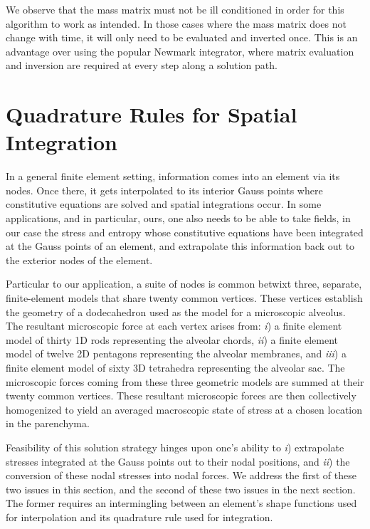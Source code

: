We observe that the mass matrix must not be ill conditioned in order for this algorithm to work as intended.  In those cases where the mass matrix does not change with time, it will only need to be evaluated and inverted once.  This is an advantage over using the popular Newmark \cite{Newmark59} integrator, where matrix evaluation and inversion are required at every step along a solution path.


\section{Quadrature Rules for Spatial Integration}
\label{sec:Gauss}

In a general finite element setting, information comes into an element via its nodes.  Once there, it gets interpolated to its interior Gauss points where constitutive equations are solved and spatial integrations occur.  In some applications, and in particular, ours, one also needs to be able to take fields, in our case the stress and entropy whose constitutive equations have been integrated at the Gauss points of an element, and extrapolate this information back out to the exterior nodes of the element.

Particular to our application, a suite of nodes is common betwixt three, separate, finite-element models that share twenty common vertices.  These vertices establish the geometry of a dodecahedron used as the model for a micro\-scopic alveolus.  The resultant micro\-scopic force at each vertex arises from: \textit{i\/}) a finite element model of thirty 1D rods representing the alveolar chords, \textit{ii\/}) a finite element model of twelve 2D pentagons representing the alveolar membranes, and \textit{iii\/}) a finite element model of sixty 3D tetrahedra representing the alveolar sac.  The micro\-scopic forces coming from these three geometric models are summed at their twenty common vertices. These resultant micro\-scopic forces are then collectively homo\-genized to yield an averaged macro\-scopic state of stress at a chosen location in the parenchyma.  

Feasibility of this solution strategy hinges upon one's ability to \textit{i\/}) extrapolate stresses integrated at the Gauss points out to their nodal positions, and \textit{ii\/}) the conversion of these nodal stresses into nodal forces.   We address the first of these two issues in this section, and the second of these two issues in the next section.  The former requires an intermingling between an element's shape functions used for interpolation and its quadrature rule used for integration.

